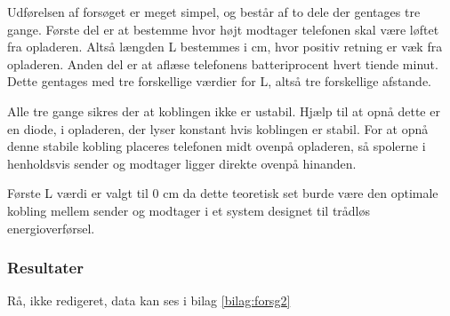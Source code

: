 Udførelsen af forsøget er meget simpel, og består af to dele der gentages tre gange. Første del er at bestemme hvor højt modtager telefonen skal være løftet fra opladeren. Altså længden L bestemmes i cm, hvor positiv retning er væk fra opladeren. Anden del er at aflæse telefonens batteriprocent hvert tiende minut. Dette gentages med tre forskellige værdier for L, altså tre forskellige afstande.

Alle tre gange sikres der at koblingen ikke er ustabil. Hjælp til at opnå dette er en diode, i opladeren, der lyser konstant hvis koblingen er stabil. For at opnå denne stabile kobling placeres telefonen midt ovenpå opladeren, så spolerne i henholdsvis sender og modtager ligger direkte ovenpå hinanden.

Første L værdi er valgt til 0 cm da dette teoretisk set burde være den optimale kobling mellem sender og modtager i et system designet til trådløs energioverførsel. 

\subsubsection{Resultater}
Rå, ikke redigeret, data kan ses i bilag \ref{bilag:forsg2}
